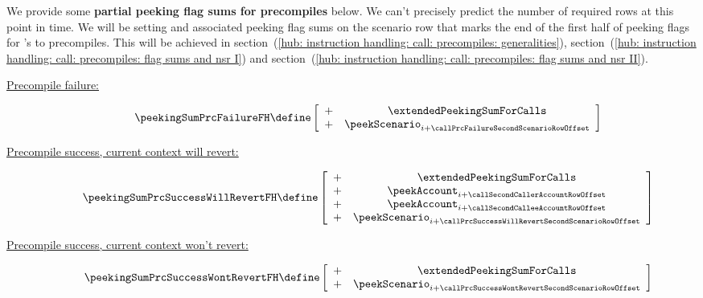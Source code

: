 We provide some \textbf{partial peeking flag sums for precompiles} below.
We can't precisely predict the number of required rows at this point in time. 
We will be setting \nonStackRows{} and associated peeking flag sums on the scenario row that marks the end of the first half of peeking flags for 's to precompiles. 
This will be achieved in 
section~(\ref{hub: instruction handling: call: precompiles: generalities}),
section~(\ref{hub: instruction handling: call: precompiles: flag sums and nsr I}) and
section~(\ref{hub: instruction handling: call: precompiles: flag sums and nsr II}).
\begin{description}
	\item[\underline{Precompile failure:}]
		\[
			\peekingSumPrcFailureFH
			\define
			\left[ \begin{array}{lcl}
				+ & \extendedPeekingSumForCalls                                 \\
				+ & \peekScenario _{i + \callPrcFailureSecondScenarioRowOffset} \\
			\end{array} \right]
		\]
	\item[\underline{Precompile success, current context will revert:}]
		\[
			\peekingSumPrcSuccessWillRevertFH
			\define
			\left[ \begin{array}{lcl}
				+ & \extendedPeekingSumForCalls                                           \\
				+ & \peekAccount  _{i + \callSecondCallerAccountRowOffset}                \\
				+ & \peekAccount  _{i + \callSecondCalleeAccountRowOffset}                \\
				+ & \peekScenario _{i + \callPrcSuccessWillRevertSecondScenarioRowOffset} \\
			\end{array} \right]
		\]
	\item[\underline{Precompile success, current context won't revert:}]
		\[
			\peekingSumPrcSuccessWontRevertFH
			\define
			\left[ \begin{array}{lcl}
				+ & \extendedPeekingSumForCalls                                           \\
				+ & \peekScenario _{i + \callPrcSuccessWontRevertSecondScenarioRowOffset} \\
			\end{array} \right]
		\]
\end{description}
